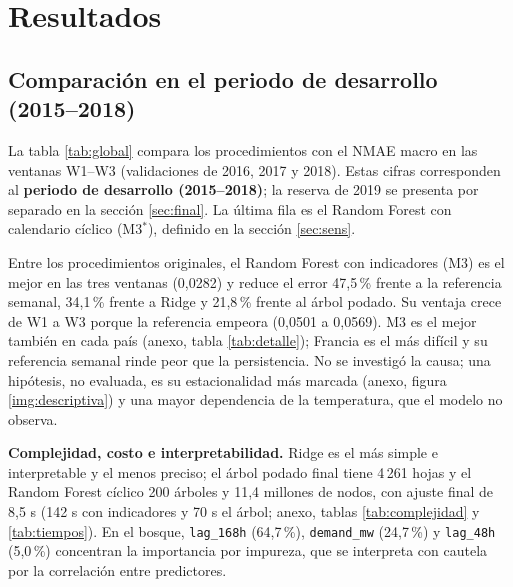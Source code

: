 \section{Resultados}

\subsection{Comparación en el periodo de desarrollo (2015--2018)}

La tabla \ref{tab:global} compara los procedimientos con el NMAE macro en las ventanas W1--W3 (validaciones de 2016, 2017 y 2018). Estas cifras corresponden al \textbf{periodo de desarrollo (2015--2018)}; la reserva de 2019 se presenta por separado en la sección \ref{sec:final}. La última fila es el Random Forest con calendario cíclico (M3$^\ast$), definido en la sección \ref{sec:sens}.

\begin{table}[!htbp]
    \centering
        \caption{NMAE macro por ventana de validación (adimensional), promedio y desviación estándar entre ventanas (descriptiva: las ventanas comparten datos de entrenamiento), y cambio relativo del promedio frente a la referencia estacional semanal.}
        \label{tab:global}
        \footnotesize
        
\end{table}

Entre los procedimientos originales, el Random Forest con indicadores (M3) es el mejor en las tres ventanas (0,0282) y reduce el error 47,5\,\% frente a la referencia semanal, 34,1\,\% frente a Ridge y 21,8\,\% frente al árbol podado. Su ventaja crece de W1 a W3 porque la referencia empeora (0,0501 a 0,0569). M3 es el mejor también en cada país (anexo, tabla \ref{tab:detalle}); Francia es el más difícil y su referencia semanal rinde peor que la persistencia. No se investigó la causa; una hipótesis, no evaluada, es su estacionalidad más marcada (anexo, figura \ref{img:descriptiva}) y una mayor dependencia de la temperatura, que el modelo no observa.

\textbf{Complejidad, costo e interpretabilidad.} Ridge es el más simple e interpretable y el menos preciso; el árbol podado final tiene 4\,261 hojas y el Random Forest cíclico 200 árboles y 11,4 millones de nodos, con ajuste final de 8,5 s (142 s con indicadores y 70 s el árbol; anexo, tablas \ref{tab:complejidad} y \ref{tab:tiempos}). En el bosque, \texttt{lag\_168h} (64,7\,\%), \texttt{demand\_mw} (24,7\,\%) y \texttt{lag\_48h} (5,0\,\%) concentran la importancia por impureza, que se interpreta con cautela por la correlación entre predictores.


